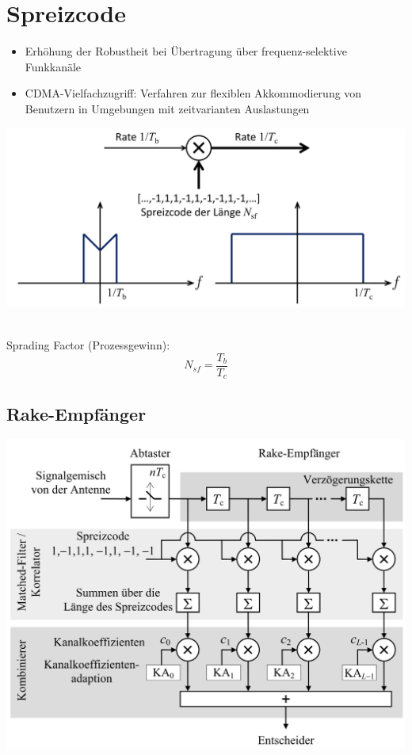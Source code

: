 \chapter{Spreizcode}
\begin{itemize}
	\item Erhöhung der Robustheit bei Übertragung über frequenz-selektive Funkkanäle
	\item CDMA-Vielfachzugriff: Verfahren zur flexiblen Akkommodierung von Benutzern
	in Umgebungen mit zeitvarianten Auslastungen
\end{itemize}

\begin{center}
	\includegraphics[width=.9\textwidth]{../fig/spreiz.png}
\end{center}
~\\
Sprading Factor (Prozessgewinn):
\[ N_{sf} = \frac{T_b}{T_c} \]

\section{Rake-Empfänger}
\begin{center}
	\includegraphics[width=.9\textwidth]{../fig/rake.png}
\end{center}

